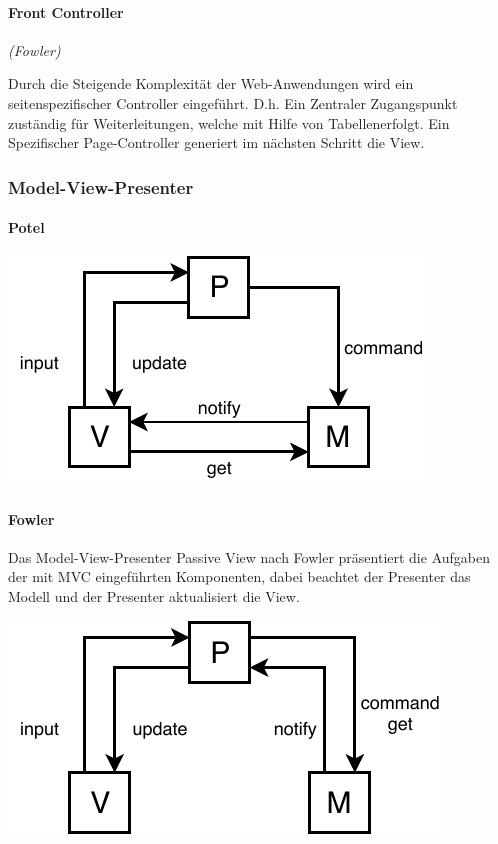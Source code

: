 \documentclass
[
	8pt,		%
	ngerman,	%
	a4paper,	%
	landscape,	%
	final		%
]{extarticle}
\begin{document}
\begin{multicols*}{4}
	\paragraph{Front Controller} \emph{(Fowler)} \par
	Durch die Steigende Komplexität der Web-Anwendungen wird ein
	seitenspezifischer Controller eingeführt. D.h. Ein Zentraler Zugangspunkt
	zuständig für Weiterleitungen, welche mit Hilfe von Tabellenerfolgt. Ein
	Spezifischer Page-Controller generiert im nächsten Schritt die View.
	\subsubsection{Model-View-Presenter}
	\paragraph{Potel}
	\begin{center}
		\includegraphics[width=0.7\linewidth]{./pictures/mvp_potel.pdf}
	\end{center}
	\paragraph{Fowler}
	Das Model-View-Presenter Passive View nach Fowler präsentiert die Aufgaben
	der mit MVC eingeführten Komponenten, dabei beachtet der Presenter das Modell
	und der Presenter aktualisiert die View.
	\begin{center}
		\includegraphics[width=0.7\linewidth]{./pictures/mvp_fowler.pdf}
	\end{center}

\end{multicols*}
\end{document}
